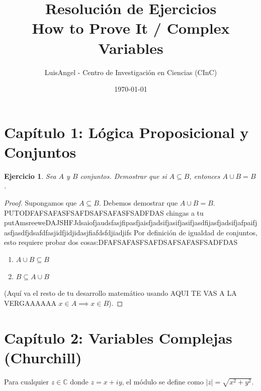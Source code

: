 \documentclass[11pt, letterpaper]{article}
\title{\textbf{Resolución de Ejercicios}\\ \large How to Prove It / Complex Variables}
\author{LuisAngel - Centro de Investigación en Ciencias (CInC)}
\date{\today}
\newtheorem{exercise}{Ejercicio}
\begin{document}
\maketitle

\section*{Capítulo 1: Lógica Proposicional y Conjuntos}

\begin{exercise}
Sea $A$ y $B$ conjuntos. Demostrar que si $A \subseteq B$, entonces $A \cup B = B$.
\end{exercise}

\begin{proof}
Supongamos que $A \subseteq B$. Debemos demostrar que $A \cup B = B$. PUTODFAFSAFASFSAFDSAFSAFASFSADFDAS chingas a tu putAmsreeweDAJSHFJdsaiofjaudsfasjfipasfjaisfjadsifjasifjasifjasdfijasfjadsifjafpaifjasfjasdfjdsafdfasjidfjidjidasjfiafdsfdjiadjifs
Por definición de igualdad de conjuntos, esto requiere probar dos cosas:DFAFSAFASFSAFDSAFSAFASFSADFDAS
\begin{enumerate}
    \item $A \cup B \subseteq B$
    \item $B \subseteq A \cup B$
\end{enumerate}
(Aquí va el resto de tu desarrollo matemático usando AQUI TE VAS A LA VERGAAAAAA $x \in A \implies x \in B$).
\end{proof}

\section*{Capítulo 2: Variables Complejas (Churchill)}
Para cualquier $z \in \mathbb{C}$ donde $z = x + iy$, el módulo se define como $|z| = \sqrt{x^2 + y^2}$.
\end{document}
